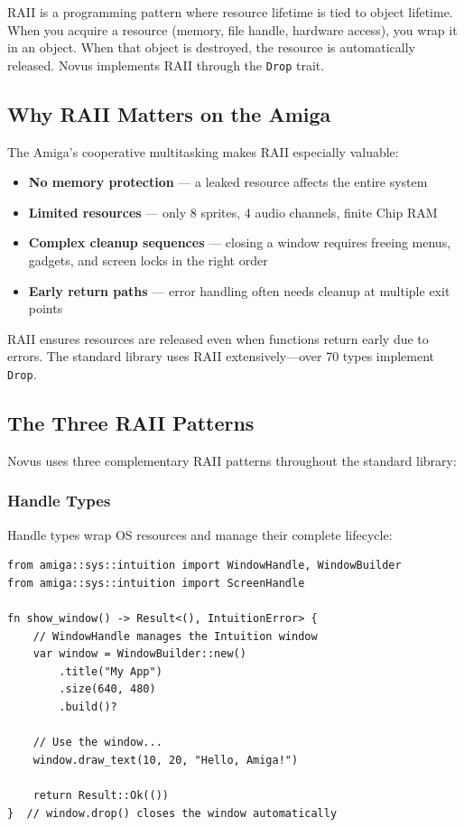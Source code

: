 RAII is a programming pattern where resource lifetime is tied to object lifetime. When you acquire a resource (memory, file handle, hardware access), you wrap it in an object. When that object is destroyed, the resource is automatically released. Novus implements RAII through the \texttt{Drop} trait.

\subsection{Why RAII Matters on the Amiga}

The Amiga's cooperative multitasking makes RAII especially valuable:

\begin{itemize}
    \item \textbf{No memory protection} --- a leaked resource affects the entire system
    \item \textbf{Limited resources} --- only 8 sprites, 4 audio channels, finite Chip RAM
    \item \textbf{Complex cleanup sequences} --- closing a window requires freeing menus, gadgets, and screen locks in the right order
    \item \textbf{Early return paths} --- error handling often needs cleanup at multiple exit points
\end{itemize}

RAII ensures resources are released even when functions return early due to errors. The standard library uses RAII extensively---over 70 types implement \texttt{Drop}.

\subsection{The Three RAII Patterns}

Novus uses three complementary RAII patterns throughout the standard library:

\subsubsection{Handle Types}

Handle types wrap OS resources and manage their complete lifecycle:

\begin{lstlisting}
from amiga::sys::intuition import WindowHandle, WindowBuilder
from amiga::sys::intuition import ScreenHandle

fn show_window() -> Result<(), IntuitionError> {
    // WindowHandle manages the Intuition window
    var window = WindowBuilder::new()
        .title("My App")
        .size(640, 480)
        .build()?

    // Use the window...
    window.draw_text(10, 20, "Hello, Amiga!")

    return Result::Ok(())
}  // window.drop() closes the window automatically
\end{lstlisting}

